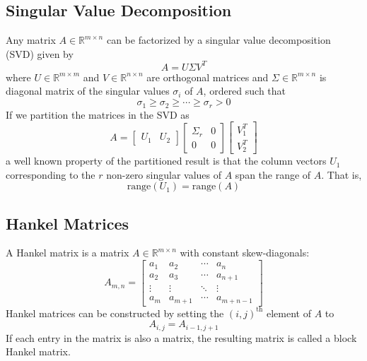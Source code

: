 \subsection{Singular Value Decomposition}
Any matrix $A \in \mathbb{R}^{m\times n}$ can be factorized by a singular value decomposition (SVD) given by
\begin{equation*}
A = U\Sigma V^T
\end{equation*}
where $U \in \mathbb{R}^{m\times m}$ and $V \in \mathbb{R}^{n\times n}$ are orthogonal matrices and $\Sigma \in \mathbb{R}^{m\times n}$ is diagonal matrix of the singular values $\sigma_i$ of $A$, ordered such that
\begin{equation*}
\sigma_1 \geq \sigma_2 \geq \cdots \geq \sigma_r > 0
\end{equation*}
If we partition the matrices in the SVD as
\begin{equation*}
A = \left[\begin{array}{c|c}
U_1 & U_2
\end{array}\right]
\left[\begin{array}{c|c}
\Sigma_r & 0 \\ \hline 0 & 0
\end{array}\right]
\left[\begin{array}{c}
V_1^T \\ \hline V_2^T
\end{array}\right]
\end{equation*}
a well known property of the partitioned result is that the column vectors $U_1$ corresponding to the $r$ non-zero singular values of $A$ span the range of $A$. That is,
\begin{equation*}
\mbox{range}(U_1) = \mbox{range}(A)
\end{equation*}

\subsection{Hankel Matrices}
A Hankel matrix is a matrix $A \in \mathbb{R}^{m\times n}$ with constant skew-diagonals:
\begin{equation*}
A_{m,n} = \begin{bmatrix}
a_1 & a_2 & \cdots & a_n\\
a_2 & a_3 & \cdots & a_{n+1}\\
\vdots & \vdots & \ddots & \vdots\\
a_m & a_{m+1} & \cdots & a_{m+n-1}
\end{bmatrix}
\end{equation*}
Hankel matrices can be constructed by setting the $(i,j)^{\mbox{th}}$ element of $A$ to
\begin{equation*}
A_{i,j} = A_{i-1, j+1}
\end{equation*}
If each entry in the matrix is also a matrix, the resulting matrix is called a block Hankel matrix.


